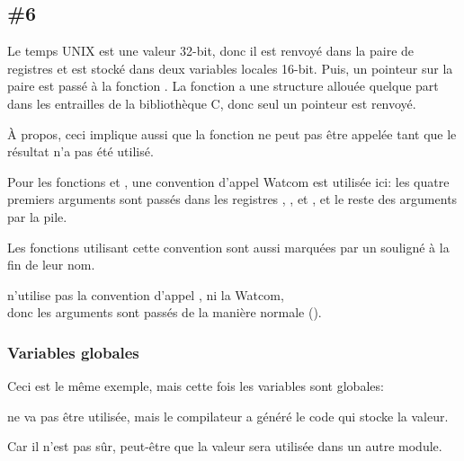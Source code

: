 \subsection{\Example{} \#6}






Le temps UNIX est une valeur 32-bit, donc il est renvoyé dans la paire de registres
 et est stocké dans deux variables locales 16-bit.
Puis, un pointeur sur la paire est passé à la fonction .
La fonction  a une structure  allouée quelque part
dans les entrailles de la bibliothèque C, donc seul un pointeur est renvoyé.

À propos, ceci implique aussi que la fonction ne peut pas être appelée tant que le
résultat n'a pas été utilisé.

Pour les fonctions  et , une convention d'appel Watcom
est utilisée ici:
les quatre premiers arguments sont passés dans les registres , , 
et , et le reste des arguments par la pile.

Les fonctions utilisant cette convention sont aussi marquées par un souligné à la
fin de leur nom.

 n'utilise pas la convention d'appel , ni la Watcom,\\ %
donc les arguments sont passés de la manière  normale ().

\subsubsection{Variables globales}

Ceci est le même exemple, mais cette fois les variables sont globales:





 ne va pas être utilisée, mais le compilateur a généré le code qui stocke
la valeur.

Car il n'est pas sûr, peut-être que la valeur sera utilisée dans un autre module.
